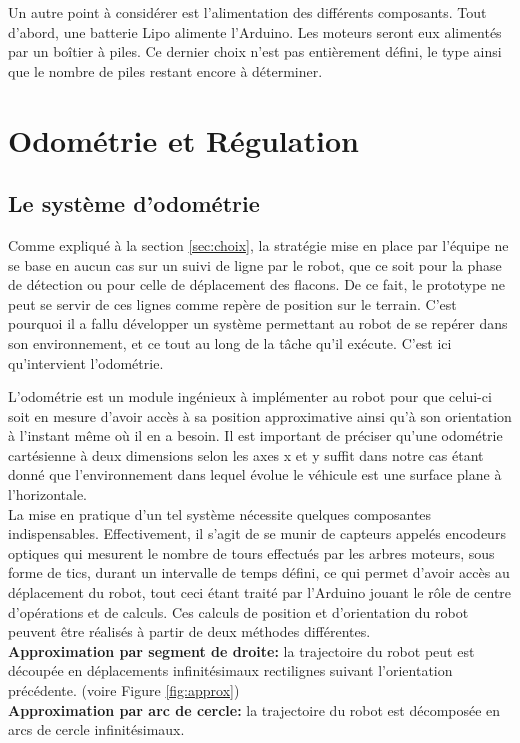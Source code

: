 \documentclass[a4paper,11pt]{article}
\begin{document}
Un autre point à considérer est l'alimentation des différents composants. Tout d'abord, une batterie Lipo alimente l'Arduino. Les moteurs seront eux alimentés par un boîtier à piles. Ce dernier choix n'est pas entièrement défini, le type ainsi que le nombre de piles restant encore à déterminer. 


\section{\label{sec:odo}Odométrie et Régulation}

\subsection{Le système d'odométrie}

Comme expliqué à la section \ref{sec:choix}, la stratégie mise en place par l'équipe ne se base en aucun cas sur un suivi de ligne par le robot, que ce soit pour la phase de détection ou pour celle de déplacement des flacons. De ce fait, le prototype ne peut se servir de ces lignes comme repère de position sur le terrain. C'est pourquoi il a fallu développer un système permettant au robot de se repérer dans son environnement, et ce tout au long de la tâche qu'il exécute. C'est ici qu'intervient l'odométrie.

L'odométrie est un module ingénieux à implémenter au robot pour que celui-ci soit en mesure d'avoir accès à sa position approximative ainsi qu'à son orientation à l'instant même où il en a besoin. Il est important de préciser qu'une odométrie cartésienne à deux dimensions selon les axes x et y suffit dans notre cas étant donné que l'environnement dans lequel évolue le véhicule est une surface plane à l'horizontale.\\

La mise en pratique d'un tel système nécessite quelques composantes indispensables. Effectivement, il s'agit de se munir de capteurs appelés encodeurs optiques qui mesurent le nombre de tours effectués par les arbres moteurs, sous forme de tics, durant un intervalle de temps défini, ce qui permet d'avoir accès au déplacement du robot, tout ceci étant traité par l'Arduino jouant le rôle de centre d'opérations et de calculs. Ces calculs de position et d'orientation du robot peuvent être réalisés à partir de deux méthodes différentes.\\
\textbf{Approximation par segment de droite:} la trajectoire du robot peut est découpée en déplacements infinitésimaux rectilignes suivant l'orientation précédente. (voire Figure \ref{fig:approx})\\
\textbf{Approximation par arc de cercle:} la trajectoire du robot est décomposée en arcs de cercle infinitésimaux.\\
\end{document}

